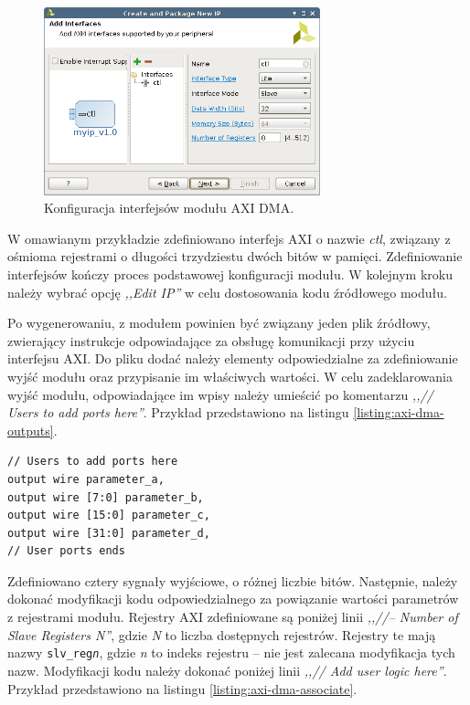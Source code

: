 \begin{figure}[H]
	\centering
	\includegraphics[width=8cm]{img/vivado/axi-dma-interfaces-conf.png}
	\caption{Konfiguracja interfejsów modułu AXI DMA.}
	\label{fig:axi-dma-interfaces-conf}
\end{figure}

W omawianym przykładzie zdefiniowano interfejs AXI o nazwie \emph{ctl}, związany z ośmioma rejestrami o długości trzydziestu dwóch bitów w pamięci.
Zdefiniowanie interfejsów kończy proces podstawowej konfiguracji modułu. W kolejnym kroku należy wybrać opcję \emph{,,Edit IP''} w celu dostosowania kodu źródłowego modułu.

Po wygenerowaniu, z modułem powinien być związany jeden plik źródłowy, zwierający instrukcje odpowiadające za obsługę komunikacji przy użyciu interfejsu AXI.
Do pliku dodać należy elementy odpowiedzialne za zdefiniowanie wyjść modułu oraz przypisanie im właściwych wartości.
W celu zadeklarowania wyjść modułu, odpowiadające im wpisy należy umieścić po komentarzu \emph{,,// Users to add ports here''}. Przykład przedstawiono na listingu \ref{listing:axi-dma-outputs}. %

\begin{lstlisting}[breaklines, label=listing:axi-dma-outputs, caption=Definicja interfejsów wyjściowych modułu.]
// Users to add ports here
output wire parameter_a,
output wire [7:0] parameter_b,
output wire [15:0] parameter_c,
output wire [31:0] parameter_d,
// User ports ends
\end{lstlisting}

Zdefiniowano cztery sygnały wyjściowe, o różnej liczbie bitów.
Następnie, należy dokonać modyfikacji kodu odpowiedzialnego za powiązanie wartości parametrów z rejestrami modułu. 
Rejestry AXI zdefiniowane są poniżej linii \emph{,,//-- Number of Slave Registers N''}, gdzie \emph{N} to liczba dostępnych rejestrów. Rejestry te mają nazwy \texttt{slv\_reg\emph{n}}, gdzie \emph{n} to indeks rejestru -- nie jest zalecana modyfikacja tych nazw.
Modyfikacji kodu należy dokonać poniżej linii \emph{,,// Add user logic here''}. 
Przykład przedstawiono na listingu \ref{listing:axi-dma-associate}.

